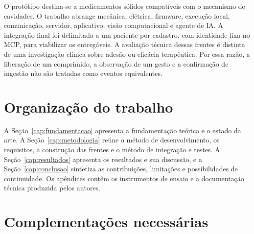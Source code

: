 O protótipo destina-se a medicamentos sólidos compatíveis com o mecanismo de cavidades. O trabalho abrange mecânica, elétrica, firmware, execução local, comunicação, servidor, aplicativo, visão computacional e agente de IA. A integração final foi delimitada a um paciente por cadastro, com identidade fixa no MCP, para viabilizar os entregáveis. A avaliação técnica dessas frentes é distinta de uma investigação clínica sobre adesão ou eficácia terapêutica. Por essa razão, a liberação de um comprimido, a observação de um gesto e a confirmação de ingestão não são tratadas como eventos equivalentes.

\section{Organização do trabalho}
A Seção~\ref{cap:fundamentacao} apresenta a fundamentação teórica e o estado da arte. A Seção~\ref{cap:metodologia} reúne o método de desenvolvimento, os requisitos, a construção das frentes e o método de integração e testes. A Seção~\ref{cap:resultados} apresenta os resultados e sua discussão, e a Seção~\ref{cap:conclusao} sintetiza as contribuições, limitações e possibilidades de continuidade. Os apêndices contêm os instrumentos de ensaio e a documentação técnica produzida pelos autores.
\section*{\textcolor{DCPendente}{Complementações necessárias}}
